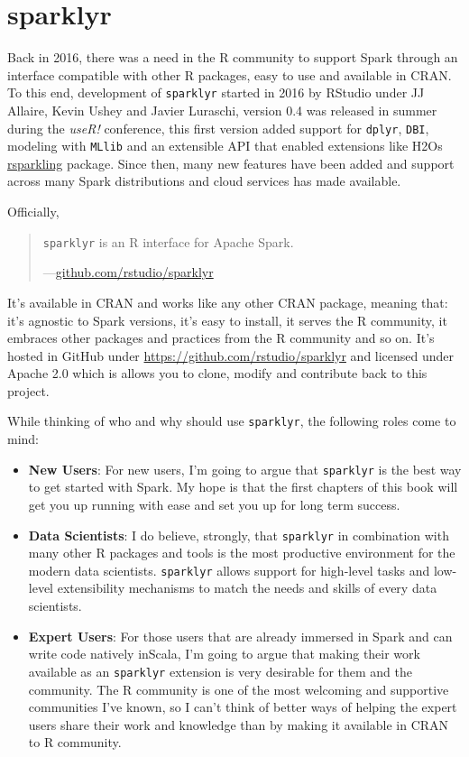 \documentclass[]{book}
\providecommand{\tightlist}{%
  \setlength{\itemsep}{0pt}\setlength{\parskip}{0pt}}
\theoremstyle{definition}
\theoremstyle{definition}
\theoremstyle{definition}
\theoremstyle{remark}
\begin{document}
\hypertarget{sparklyr}{%
\section{sparklyr}\label{sparklyr}}

Back in 2016, there was a need in the R community to support Spark
through an interface compatible with other R packages, easy to use and
available in CRAN. To this end, development of \texttt{sparklyr} started
in 2016 by RStudio under JJ Allaire, Kevin Ushey and Javier Luraschi,
version 0.4 was released in summer during the \emph{useR!} conference,
this first version added support for \texttt{dplyr}, \texttt{DBI},
modeling with \texttt{MLlib} and an extensible API that enabled
extensions like H2Os
\href{https://github.com/h2oai/rsparkling/}{rsparkling} package. Since
then, many new features have been added and support across many Spark
distributions and cloud services has made available.

Officially,

\begin{quote}
\texttt{sparklyr} is an R interface for Apache Spark.

---\href{https://github.com/rstudio/sparklyr}{github.com/rstudio/sparklyr}
\end{quote}

It's available in CRAN and works like any other CRAN package, meaning
that: it's agnostic to Spark versions, it's easy to install, it serves
the R community, it embraces other packages and practices from the R
community and so on. It's hosted in GitHub under
\href{github.com/rstudio/sparklyr}{https://github.com/rstudio/sparklyr}
and licensed under Apache 2.0 which is allows you to clone, modify and
contribute back to this project.

While thinking of who and why should use \texttt{sparklyr}, the
following roles come to mind:

\begin{itemize}
\tightlist
\item
  \textbf{New Users}: For new users, I'm going to argue that
  \texttt{sparklyr} is the best way to get started with Spark. My hope
  is that the first chapters of this book will get you up running with
  ease and set you up for long term success.
\item
  \textbf{Data Scientists}: I do believe, strongly, that
  \texttt{sparklyr} in combination with many other R packages and tools
  is the most productive environment for the modern data scientists.
  \texttt{sparklyr} allows support for high-level tasks and low-level
  extensibility mechanisms to match the needs and skills of every data
  scientists.
\item
  \textbf{Expert Users}: For those users that are already immersed in
  Spark and can write code natively inScala, I'm going to argue that
  making their work available as an \texttt{sparklyr} extension is very
  desirable for them and the community. The R community is one of the
  most welcoming and supportive communities I've known, so I can't think
  of better ways of helping the expert users share their work and
  knowledge than by making it available in CRAN to R community.
\end{itemize}
\end{document}
